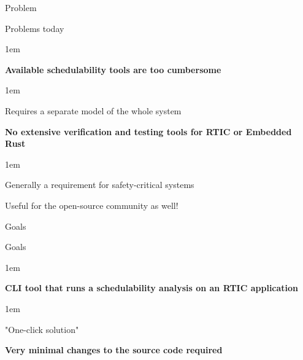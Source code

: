\begin{frame}{Problem}
    \begin{block}{Problems today}
        \begin{itemize-size}{1em}
            \item \textbf{Available schedulability tools are too cumbersome}
                \begin{itemize-size}{1em}
                    \item Requires a separate model of the whole system
                \end{itemize-size}
            \item \textbf{No extensive verification and testing tools for RTIC or Embedded Rust}
                \begin{itemize-size}{1em}
                    \item Generally a requirement for safety-critical systems
                    \item Useful for the open-source community as well!
                \end{itemize-size}
        \end{itemize-size}
    \end{block}
\end{frame}

\begin{frame}{Goals}
    \begin{block}{Goals}
        \begin{itemize-size}{1em}
            \item \textbf{CLI tool that runs a schedulability analysis on an RTIC application}
                \vspace{0.5em}
                \begin{itemize-size}{1em}
                    \item "One-click solution" 
                \end{itemize-size}
            \item \textbf{Very minimal changes to the source code required}
        \end{itemize-size}          
    \end{block}
\end{frame}

